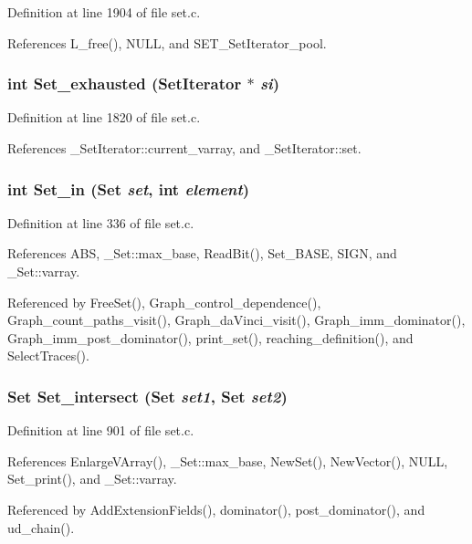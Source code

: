 Definition at line 1904 of file set.c.

References L\_\-free(), NULL, and SET\_\-Set\-Iterator\_\-pool.
\subsubsection{\setlength{\rightskip}{0pt plus 5cm}int Set\_\-exhausted (\bf{Set\-Iterator} $\ast$ {\em si})}\label{set_8c_16ec1ddec124e852fa5ef7a5239924f2}




Definition at line 1820 of file set.c.

References \_\-Set\-Iterator::current\_\-varray, and \_\-Set\-Iterator::set.
\subsubsection{\setlength{\rightskip}{0pt plus 5cm}int Set\_\-in (\bf{Set} {\em set}, int {\em element})}\label{set_8c_7c88057fd5460af2887bfed6aa27df9a}




Definition at line 336 of file set.c.

References ABS, \_\-Set::max\_\-base, Read\-Bit(), Set\_\-BASE, SIGN, and \_\-Set::varray.

Referenced by Free\-Set(), Graph\_\-control\_\-dependence(), Graph\_\-count\_\-paths\_\-visit(), Graph\_\-da\-Vinci\_\-visit(), Graph\_\-imm\_\-dominator(), Graph\_\-imm\_\-post\_\-dominator(), print\_\-set(), reaching\_\-definition(), and Select\-Traces().
\subsubsection{\setlength{\rightskip}{0pt plus 5cm}\bf{Set} Set\_\-intersect (\bf{Set} {\em set1}, \bf{Set} {\em set2})}\label{set_8c_572b2c36002765b1a4767f6f4ea1f855}




Definition at line 901 of file set.c.

References Enlarge\-VArray(), \_\-Set::max\_\-base, New\-Set(), New\-Vector(), NULL, Set\_\-print(), and \_\-Set::varray.

Referenced by Add\-Extension\-Fields(), dominator(), post\_\-dominator(), and ud\_\-chain().
